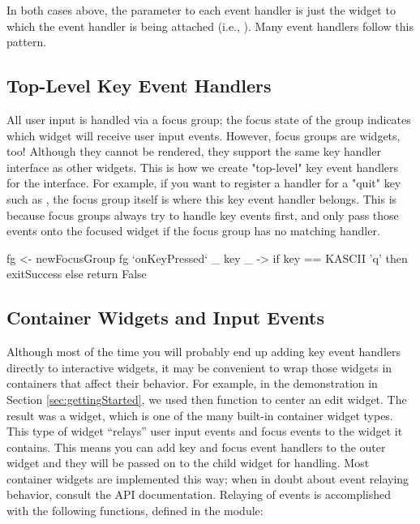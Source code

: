 In both cases above, the  parameter to each event handler is
just the widget to which the event handler is being attached (i.e.,
).  Many event handlers follow this pattern.

\subsection{Top-Level Key Event Handlers}

All user input is handled via a focus group; the focus state of the
group indicates which widget will receive user input events.  However,
focus groups are widgets, too!  Although they cannot be rendered, they
support the same key handler interface as other widgets.  This is how
we create "top-level" key event handlers for the interface.  For
example, if you want to register a handler for a "quit" key such as
, the focus group itself is where this key event handler
belongs.  This is because focus groups always try to handle key events
first, and only pass those events onto the focused widget if the focus
group has no matching handler.

\begin{haskellcode}
 fg <- newFocusGroup
 fg `onKeyPressed` \_ key _ ->
   if key == KASCII 'q' then
     exitSuccess else return False
\end{haskellcode}

\subsection{Container Widgets and Input Events}
\label{sec:containers_and_input}

Although most of the time you will probably end up adding key event
handlers directly to interactive widgets, it may be convenient to wrap
those widgets in containers that affect their behavior.  For example,
in the demonstration in Section \ref{sec:gettingStarted}, we used then
 function to center an edit widget.  The result was a
 widget, which is one of the many built-in container
widget types.  This type of widget ``relays'' user input events and
focus events to the widget it contains.  This means you can add key
and focus event handlers to the outer widget and they will be passed
on to the child widget for handling.  Most container widgets are
implemented this way; when in doubt about event relaying behavior,
consult the API documentation.  Relaying of events is accomplished
with the following functions, defined in the  module:

